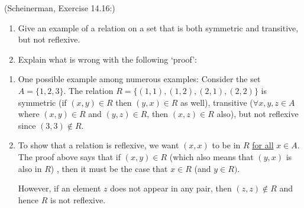 \documentclass{article}
\theoremstyle{definition}
\begin{document}
\begin{question}
    (Scheinerman, Exercise 14.16:)
    \begin{enumerate}
        \item Give an example of a relation on a set that is both symmetric and transitive, but not reflexive.
        \item Explain what is wrong with the following `proof':
        
    \end{enumerate}
\end{question}
\begin{solution}
    \begin{enumerate}
    \item One possible example among numerous examples: Consider the set $A = \{1, 2, 3\}$.  The relation $R = \{ (1, 1), (1, 2), (2, 1), (2, 2) \}$ is symmetric (if $(x, y) \in R$ then $(y, x) \in R$ as well), transitive ($\forall x, y,z \in A$ where $(x, y)\in R$ and $(y, z) \in R$, then $(x, z) \in R$ also), but not reflexive since $(3, 3) \notin R$.
    \item To show that a relation is reflexive, we want $(x, x)$ to be in $R$ \underline{for all} $x \in A$.  The proof above says that if $(x, y) \in R$ (which also means that $(y, x)$ is also in $R$) , then it must be the case that $x \in R$ (and $y \in R)$.  

    However, if an element $z$ does not appear in any pair, then $(z, z) \notin R$ and hence $R$ is not reflexive.
    \end{enumerate}
\end{solution}
\end{document}
